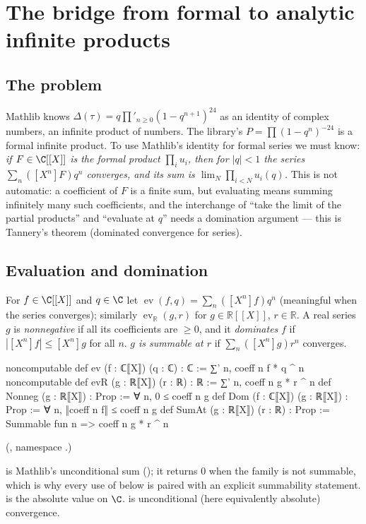 \section{The bridge from formal to analytic infinite products}\label{ch05:sec:bridge}

\subsection{The problem}

Mathlib knows $\Delta(\tau) = q\prod'_{n\ge0}(1-q^{n+1})^{24}$ as an identity of complex numbers, an
infinite product of numbers. The library's $P = \prod(1-q^n)^{-24}$ is a formal infinite product.
To use Mathlib's identity for formal series we must know: \emph{if $F\in\C[[X]]$ is the formal product
$\prod_iu_i$, then for $|q|<1$ the series $\sum_n([X^n]F)q^n$ converges, and its sum is
$\lim_N\prod_{i<N}u_i(q)$.} This is not automatic: a coefficient of $F$ is a finite sum, but evaluating
means summing infinitely many such coefficients, and the interchange of ``take the limit of the
partial products'' and ``evaluate at $q$'' needs a domination argument --- this is Tannery's theorem
(dominated convergence for series).

\subsection{Evaluation and domination}

\begin{definition}\label{ch05:def:ev}
For $f\in\C[[X]]$ and $q\in\C$ let $\operatorname{ev}(f,q) = \sum_n([X^n]f)q^n$ (meaningful when the series
converges); similarly $\operatorname{ev}_{\mathbb R}(g,r)$ for $g\in\mathbb R[[X]]$, $r\in\mathbb R$. A real
series $g$ is \emph{nonnegative} if all its coefficients are $\ge0$, and it \emph{dominates} $f$ if
$|[X^n]f|\le[X^n]g$ for all $n$. \emph{$g$ is summable at $r$} if $\sum_n([X^n]g)r^n$ converges.
\end{definition}
\begin{leancode}
noncomputable def ev (f : ℂ⟦X⟧) (q : ℂ) : ℂ := ∑' n, coeff n f * q ^ n
noncomputable def evR (g : ℝ⟦X⟧) (r : ℝ) : ℝ := ∑' n, coeff n g * r ^ n
def Nonneg (g : ℝ⟦X⟧) : Prop := ∀ n, 0 ≤ coeff n g
def Dom (f : ℂ⟦X⟧) (g : ℝ⟦X⟧) : Prop := ∀ n, ‖coeff n f‖ ≤ coeff n g
def SumAt (g : ℝ⟦X⟧) (r : ℝ) : Prop := Summable fun n => coeff n g * r ^ n
\end{leancode}
(, namespace .)
\begin{dictionary}
 is Mathlib's unconditional sum (); it returns $0$ when the family is not
summable, which is why every use of  below is paired with an explicit summability statement.
 is the absolute value on $\C$.  is unconditional (here equivalently absolute)
convergence.
\end{dictionary}

